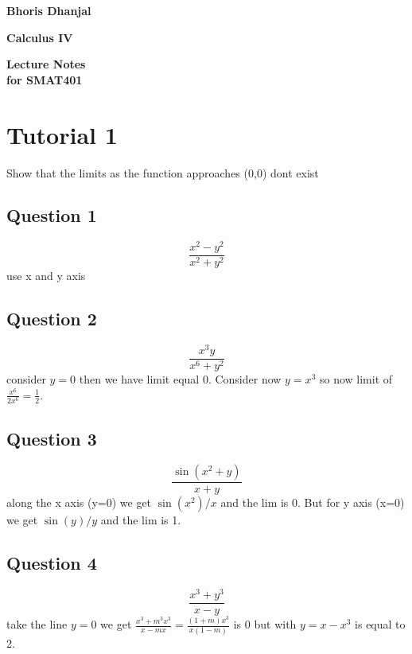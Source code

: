 \documentclass[oneside,11pt,pdftex]{book}%
\numberwithin{section}{chapter}
\numberwithin{equation}{chapter}
\begin{document}
\frontmatter

\thispagestyle{empty}
\begin{flushright}
{\LARGE \textbf{Bhoris Dhanjal}}%
\end{flushright}
\vfill
\begin{center}
{\fontsize{29.86truept}{0truept}\selectfont \textbf{Calculus IV}}%
\end{center}
\vfill
\begin{flushleft}
{\LARGE \textbf{Lecture Notes}} \\
\hspace{-1.75truept}
{\large \textbf{for SMAT401}}
\end{flushleft}
\newpage

\tableofcontents


\mainmatter

\chapter{Tutorial 1}
Show that the limits as the function approaches (0,0) dont exist
\section{Question 1}
\[ \frac{x^2-y^2}{x^2+y^2} \] use x and y axis

\section{Question 2}
\[ \frac{x^3y}{x^6+y^2} \] consider $ y=0 $ then we have limit equal 0. Consider now $ y=x^3 $ so now limit of $ \frac{x^6}{2x^6} =\frac{1}{2}$.



\section{Question 3}
\[ \frac{\sin(x^2+y)}{x+y} \] along the x axis (y=0) we get $ \sin(x^2) /x $ and the lim is 0. But for y axis (x=0) we get $ \sin(y)/y$ and the lim is 1. 

\section{Question 4}
\[ 	\frac{x^3+y^3}{x-y} \] take the line $ y=0 $ we get 
$ \frac{x^3+m^3x^3}{x-mx} =\frac{(1+m)x^3}{x(1-m)}$ is 0 but with $ y=x-x^3$ is equal to 2.
\end{document}
